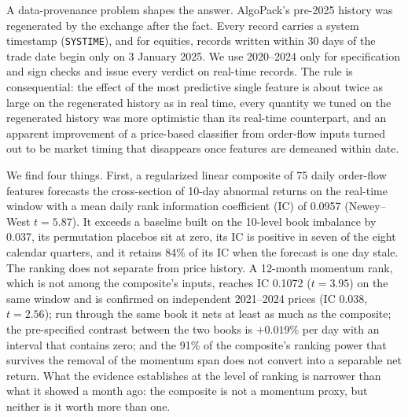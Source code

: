 A data-provenance problem shapes the answer. AlgoPack's pre-2025 history was regenerated by the exchange after the fact. Every record carries a system timestamp (\texttt{SYSTIME}), and for equities, records written within 30 days of the trade date begin only on 3 January 2025. We use 2020--2024 only for specification and sign checks and issue every verdict on real-time records. The rule is consequential: the effect of the most predictive single feature is about twice as large on the regenerated history as in real time, every quantity we tuned on the regenerated history was more optimistic than its real-time counterpart, and an apparent improvement of a price-based classifier from order-flow inputs turned out to be market timing that disappears once features are demeaned within date.

We find four things. First, a regularized linear composite of 75 daily order-flow features forecasts the cross-section of 10-day abnormal returns on the real-time window with a mean daily rank information coefficient (IC) of 0.0957 (Newey--West $t=5.87$). It exceeds a baseline built on the 10-level book imbalance by 0.037, its permutation placebos sit at zero, its IC is positive in seven of the eight calendar quarters, and it retains 84\% of its IC when the forecast is one day stale. The ranking does not separate from price history. A 12-month momentum rank, which is not among the composite's inputs, reaches IC 0.1072 ($t=3.95$) on the same window and is confirmed on independent 2021--2024 prices (IC 0.038, $t=2.56$); run through the same book it nets at least as much as the composite; the pre-specified contrast between the two books is $+0.019$\% per day with an interval that contains zero; and the 91\% of the composite's ranking power that survives the removal of the momentum span does not convert into a separable net return. What the evidence establishes at the level of ranking is narrower than what it showed a month ago: the composite is not a momentum proxy, but neither is it worth more than one.

